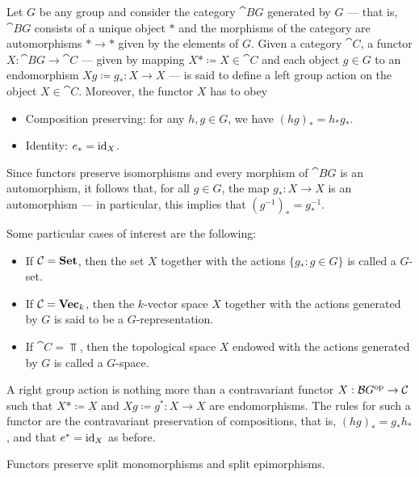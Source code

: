 \begin{example}\label{exp:grp-action}
Let \(G\) be any group and consider the category \(\cat{B}G\) generated by \(G\)
--- that is, \(\cat BG\) consists of a unique object \(*\) and the morphisms of
the category are automorphisms \(* \to *\) given by the elements of \(G\). Given
a category \(\cat C\), a functor \(X: \cat BG \to \cat C\) --- given by mapping
\(X* \coloneq X \in \cat C\) and each object \(g \in G\) to an endomorphism \(Xg
\coloneq g_{*}: X \to X\) --- is said to define a left group action on the
object \(X \in \cat C\). Moreover, the functor \(X\) has to obey
\begin{itemize}\setlength\itemsep{0em}
\item Composition preserving: for any \(h, g \in G\), we have \((h g)_{*} =
  h_{*} g_{*}\).
\item Identity: \(e_{*} = \operatorname{id}_X\).
\end{itemize}
Since functors preserve isomorphisms and every morphism of \(\cat BG\) is an
automorphism, it follows that, for all \(g \in G\), the map \(g_{*}: X \to X\)
is an automorphism --- in particular, this implies that \((g^{-1})_{*} =
g_{*}^{-1}\).

Some particular cases of interest are the following:
\begin{itemize}\setlength\itemsep{0em}
\item If \(\mathcal C = {\textbf{Set}}\), then the set \(X\) together with the actions
  \(\{g_{*} \colon g \in G\}\) is called a \(G\)-set.
\item If \(\mathcal C = {\textbf{Vec}}_k\), then the \(k\)-vector space \(X\) together with
  the actions generated by \(G\) is said to be a \(G\)-representation.
\item If \(\cat C = \Top\), then the topological space \(X\) endowed with the
  actions generated by \(G\) is called a \(G\)-space.
\end{itemize}

A right group action is nothing more than a contravariant functor \(X: \mathcal
BG^{\mathrm{op}} \to \mathcal C\) such that \(X* \coloneq X\) and \(Xg \coloneq g^{*}: X \to
X\) are endomorphisms. The rules for such a functor are the contravariant
preservation of compositions, that is, \((h g)_{*} = g_{*} h_{*}\), and that
\(e^{*} = \operatorname{id}_X\) as before.
\end{example}

\begin{lemma}\label{lem: func-preserve-split}
Functors preserve split monomorphisms and split epimorphisms.
\end{lemma}

